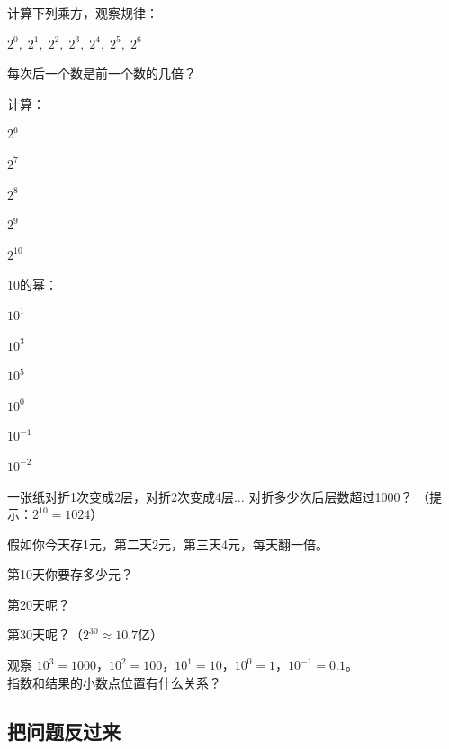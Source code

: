 \begin{exercise}
\item 计算下列乘方，观察规律：
  \begin{subexercise}
    \item $2^0,\;2^1,\;2^2,\;2^3,\;2^4,\;2^5,\;2^6$
    \item 每次后一个数是前一个数的几倍？
  \end{subexercise}

\item 计算：
  \begin{subexercise}
    \item $2^6$
    \item $2^7$
    \item $2^8$
    \item $2^9$
    \item $2^{10}$
  \end{subexercise}

\item 10的幂：
  \begin{subexercise}
    \item $10^1$
    \item $10^3$
    \item $10^5$
    \item $10^0$
    \item $10^{-1}$
    \item $10^{-2}$
  \end{subexercise}

\item 一张纸对折1次变成2层，对折2次变成4层$\ldots$ 对折多少次后层数超过1000？
  （提示：$2^{10}=1024$）

\item 假如你今天存1元，第二天2元，第三天4元，每天翻一倍。
  \begin{subexercise}
    \item 第10天你要存多少元？
    \item 第20天呢？
    \item 第30天呢？（$2^{30}\approx10.7亿$）
  \end{subexercise}

\item 观察 $10^3=1000$，$10^2=100$，$10^1=10$，$10^0=1$，$10^{-1}=0.1$。\\
  指数和结果的小数点位置有什么关系？
\end{exercise}


\subsection*{把问题反过来}

